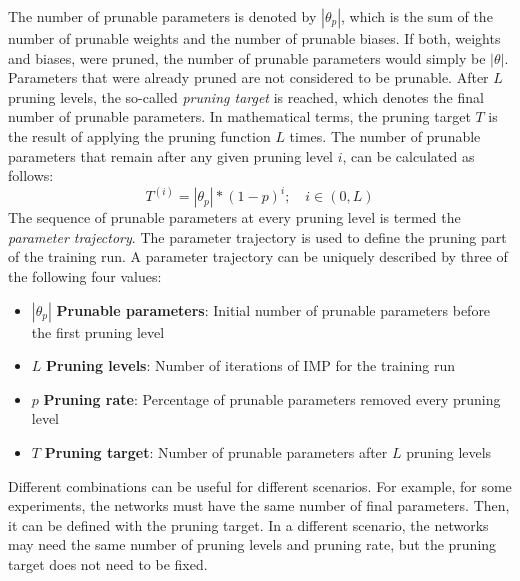 The number of prunable parameters is denoted by $|\theta_p|$, which is the sum of the number of prunable weights and the number of prunable biases.
If both, weights and biases, were pruned, the number of prunable parameters would simply be $|\theta|$.
Parameters that were already pruned are not considered to be prunable.
After $L$ pruning levels, the so-called \textit{pruning target} is reached, which denotes the final number of prunable parameters.
In mathematical terms, the pruning target $T$ is the result of applying the pruning function $L$ times.
The number of prunable parameters that remain after any given pruning level $i$, can be calculated as follows:
\[ T^{(i)} = |\theta_p| * {(1-p)}^i ; \quad i \in (0,L) \]
The sequence of prunable parameters at every pruning level is termed the \textit{parameter trajectory}.
The parameter trajectory is used to define the pruning part of the training run.
A parameter trajectory can be uniquely described by three of the following four values:
\begin{itemize}
    \item $|\theta_p|$ \textbf{Prunable parameters}: Initial number of prunable parameters before the first pruning level
    \item $L$ \textbf{Pruning levels}: Number of iterations of IMP for the training run
    \item $p$ \textbf{Pruning rate}: Percentage of prunable parameters removed every pruning level
    \item $T$ \textbf{Pruning target}: Number of prunable parameters after $L$ pruning levels
\end{itemize}
Different combinations can be useful for different scenarios.
For example, for some experiments, the networks must have the same number of final parameters.
Then, it can be defined with the pruning target.
In a different scenario, the networks may need the same number of pruning levels and pruning rate, but the pruning target does not need to be fixed.

